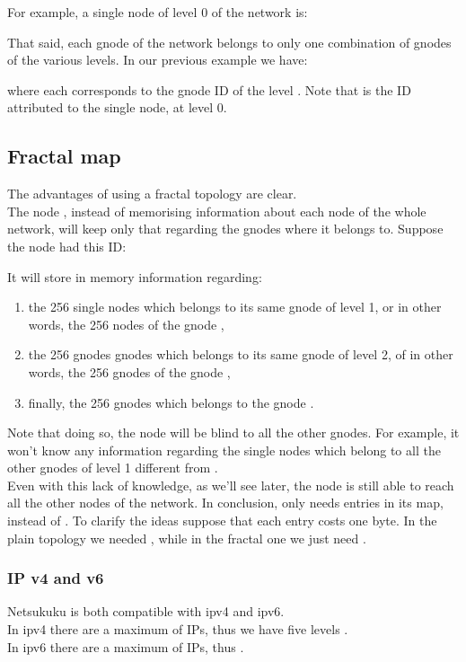 \documentclass[a4paper]{article}
\begin{document}
For example, a single node of level 0 of the network is:

That said, each gnode of the network belongs to only one combination of gnodes
of the various levels. In our previous example we have:

where each  corresponds to the gnode ID of the level . Note that 
is the ID attributed to the single node, at level 0.

\subsection{Fractal map}
The advantages of using a fractal topology are clear.\\
The node , instead of memorising information about each node of the whole
network, will keep only that regarding the gnodes where it belongs to.
Suppose the node  had this ID:

It will store in memory information regarding:
\begin{enumerate}
	\item the 256 single nodes which belongs to its same gnode of level 1,
		or in other words, the 256 nodes of the gnode ,
	\item the 256 gnodes gnodes which belongs to its same gnode of level
		2, of in other words, the 256 gnodes of the gnode ,
	\item finally, the 256 gnodes which belongs to the gnode .
\end{enumerate}
Note that doing so, the node  will be blind to all the other gnodes. For
example, it won't know any information regarding the single nodes which belong
to all the other gnodes of level 1 different from .\\

Even with this lack of knowledge, as we'll see later, the node  is still
able to reach all the other nodes of the network.
In conclusion,  only needs  entries in its map, instead of . 
To clarify the ideas suppose that each entry costs one byte. In the plain
topology we needed , while in the fractal one we just need .

\subsubsection{IP v4 and v6}
Netsukuku is both compatible with ipv4 and ipv6.\\

In ipv4 there are a maximum of  IPs, thus we have five levels .\\
In ipv6 there are a maximum of  IPs, thus .
\end{document}
